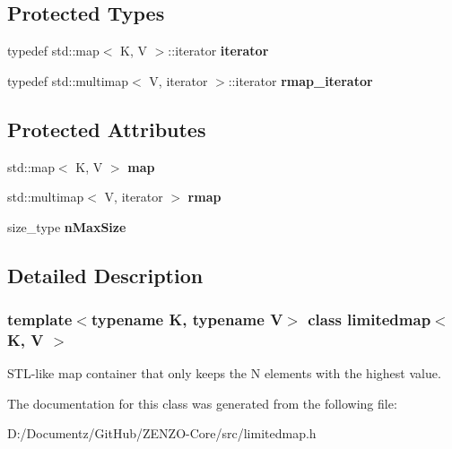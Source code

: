 \subsection*{Protected Types}
\begin{DoxyCompactItemize}
\item 
\mbox{\label{classlimitedmap_aea661213ab6f699e9667bea25bf99821}} 
typedef std\+::map$<$ K, V $>$\+::iterator {\bfseries iterator}
\item 
\mbox{\label{classlimitedmap_ad3d926b1f365d819073ddaed8daa4400}} 
typedef std\+::multimap$<$ V, iterator $>$\+::iterator {\bfseries rmap\+\_\+iterator}
\end{DoxyCompactItemize}
\subsection*{Protected Attributes}
\begin{DoxyCompactItemize}
\item 
\mbox{\label{classlimitedmap_a66e668a5286b7b82061c6867548897a0}} 
std\+::map$<$ K, V $>$ {\bfseries map}
\item 
\mbox{\label{classlimitedmap_ab4a6f5b1572ee3754d53f7773b381eb2}} 
std\+::multimap$<$ V, iterator $>$ {\bfseries rmap}
\item 
\mbox{\label{classlimitedmap_a3ff20a34a489085042060796d44a644e}} 
size\+\_\+type {\bfseries n\+Max\+Size}
\end{DoxyCompactItemize}


\subsection{Detailed Description}
\subsubsection*{template$<$typename K, typename V$>$\newline
class limitedmap$<$ K, V $>$}

S\+T\+L-\/like map container that only keeps the N elements with the highest value. 

The documentation for this class was generated from the following file\+:\begin{DoxyCompactItemize}
\item 
D\+:/\+Documentz/\+Git\+Hub/\+Z\+E\+N\+Z\+O-\/\+Core/src/limitedmap.\+h\end{DoxyCompactItemize}

